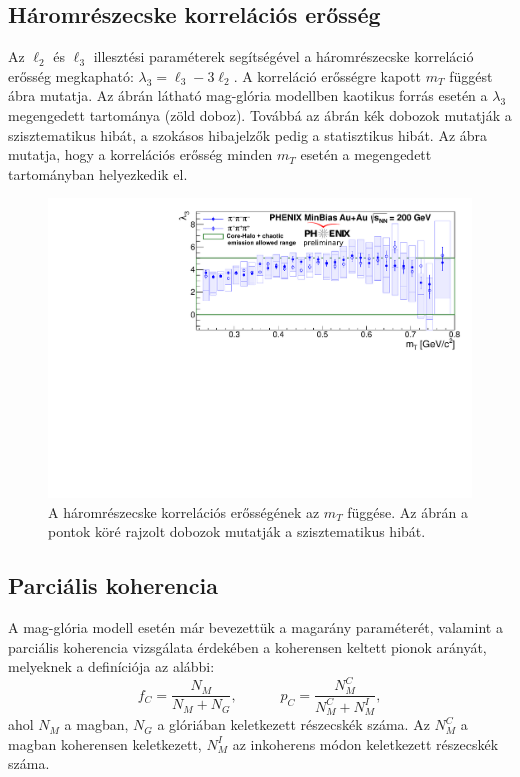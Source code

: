\documentclass[11pt,a4paper]{article}
\numberwithin{equation}{subsection}
\numberwithin{figure}{section}
\begin{document}
\subsection{Háromrészecske korrelációs erősség}

Az $\ell_2$ és $\ell_3$ illesztési paraméterek segítségével a háromrészecske korreláció erősség megkapható: $\lambda_3=\ell_3-3\ell_2$. A korreláció erősségre kapott $m_T$ függést ~ ábra mutatja. Az ábrán látható mag-glória modellben kaotikus forrás esetén a $\lambda_3$ megengedett tartománya (zöld doboz). Továbbá az ábrán kék dobozok mutatják a szisztematikus hibát, a szokásos hibajelzők pedig a statisztikus hibát. Az ábra mutatja, hogy a korrelációs erősség minden $m_T$ esetén a megengedett tartományban helyezkedik el.

\begin{figure}[H]
\centering
\includegraphics[scale=0.75]{pic/res/lambda3.pdf}
\caption{A háromrészecske korrelációs erősségének az $m_T$ függése. Az ábrán a pontok köré rajzolt dobozok mutatják a szisztematikus hibát.}
\label{fig:lambda3}
\end{figure}

\subsection{Parciális koherencia}

A mag-glória modell esetén már bevezettük a magarány paraméterét, valamint a parciális koherencia vizsgálata érdekében a koherensen keltett pionok arányát, melyeknek a definíciója az alábbi:
\begin{equation}
f_C=\frac{N_M}{N_M+N_G},\;\;\;\;\;\;\;\;\;\;\;p_C = \frac{N_M^C}{N_M^C+N_M^I},
\end{equation}
ahol $N_M$ a magban, $N_G$ a glóriában keletkezett részecskék száma. Az $N_M^C$ a magban koherensen keletkezett, $N_M^I$ az inkoherens módon keletkezett részecskék száma.
\end{document}
